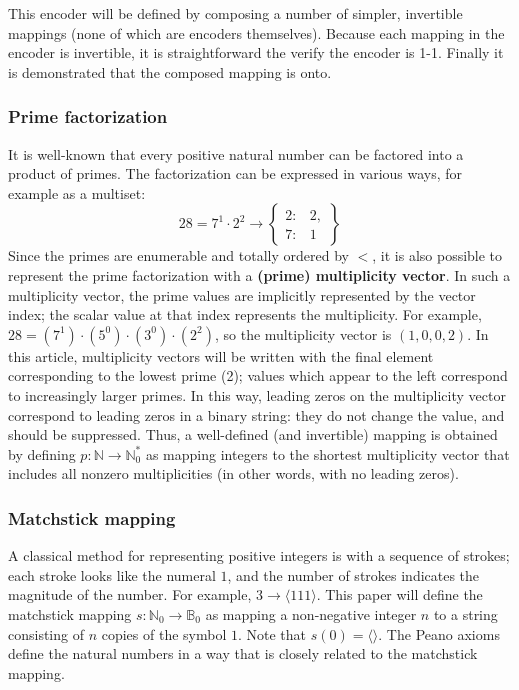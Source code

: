 \documentclass[12pt,reqno]{article}
\begin{document}
This encoder will be defined by composing a number of simpler, invertible mappings (none of which are encoders themselves). Because each mapping in the encoder is invertible, it is straightforward the verify the encoder is 1-1. Finally it is demonstrated that the composed mapping is onto.

\subsubsection{Prime factorization}

It is well-known that every positive natural number can be factored into a product of primes. The factorization can be expressed in various ways, for example as a multiset:
\begin{equation}
28 = 7^1 \cdot 2^2 \rightarrow \begin{Bmatrix}
        2: & 2, \\
        7: & 1
    \end{Bmatrix}
\end {equation}
Since the primes are enumerable and totally ordered by $<$, it is also possible to represent the prime factorization with a \textbf{(prime) multiplicity vector}. In such a multiplicity vector, the prime values are implicitly represented by the vector index; the scalar value at that index represents the multiplicity. For example, $28 = (7^1) \cdot (5^0) \cdot (3^0) \cdot (2^2)$, so the multiplicity vector is $(1, 0, 0, 2)$. In this article, multiplicity vectors will be written with the final element corresponding to the lowest prime (2); values which appear to the left correspond to increasingly larger primes. In this way, leading zeros on the multiplicity vector correspond to leading zeros in a binary string: they do not change the value, and should be suppressed. Thus, a well-defined (and invertible) mapping is obtained by defining $p : \mathbb{N} \rightarrow \mathbb{N}_0^{*}$ as mapping integers to the shortest multiplicity vector that includes all nonzero multiplicities (in other words, with no leading zeros).

\subsubsection{Matchstick mapping}

A classical method for representing positive integers is with a sequence of strokes; each stroke looks like the numeral $1$, and the number of strokes indicates the magnitude of the number. For example, $3 \rightarrow \langle 111 \rangle$. This paper will define the matchstick mapping $s : \mathbb{N}_0 \rightarrow \mathbb{B}_0$ as mapping a non-negative integer $n$ to a string consisting of $n$ copies of the symbol $1$. Note that $s(0) = \langle \rangle$. The Peano axioms define the natural numbers in a way that is closely related to the matchstick mapping.
\end{document}
